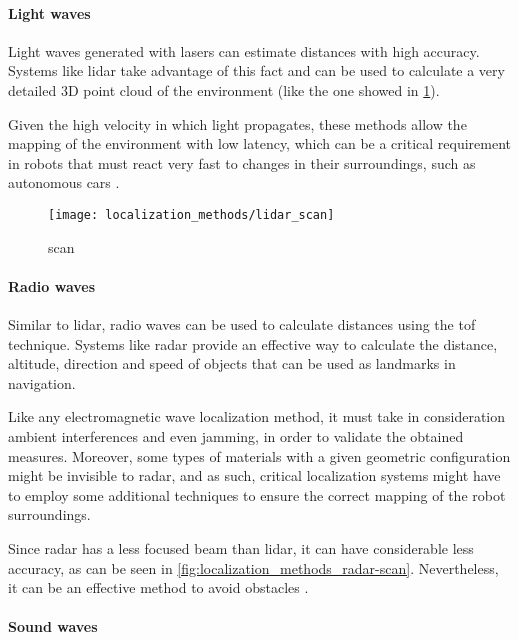\paragraph{Light waves}

Light waves generated with lasers can estimate distances with high accuracy. Systems like \gls{lidar} take advantage of this fact and can be used to calculate a very detailed 3D point cloud of the environment (like the one showed in \cref{fig:localization-methods_lidar-scan}).

Given the high velocity in which light propagates, these methods allow the mapping of the environment with low latency, which can be a critical requirement in robots that must react very fast to changes in their surroundings, such as autonomous cars \cite{Moras2010}.

\begin{figure}[h]
	\centering
	\texttt{[image: localization\_methods/lidar\_scan]}
	\caption{ scan\protect\footnotemark}
	\label{fig:localization-methods_lidar-scan}
\end{figure}


\paragraph{Radio waves}

Similar to \gls{lidar}, radio waves can be used to calculate distances using the \gls{tof} technique. Systems like \gls{radar} provide an effective way to calculate the distance, altitude, direction and speed of objects that can be used as landmarks in navigation.

Like any electromagnetic wave localization method, it must take in consideration ambient interferences and even jamming, in order to validate the obtained measures. Moreover, some types of materials with a given geometric configuration might be invisible to \gls{radar}, and as such, critical localization systems might have to employ some additional techniques to ensure the correct mapping of the robot surroundings.

Since \gls{radar} has a less focused beam than \gls{lidar}, it can have considerable less accuracy, as can be seen in \cref{fig:localization_methods_radar-scan}. Nevertheless, it can be an effective method to avoid obstacles \cite{Wu2007}.

\paragraph{Sound waves}


